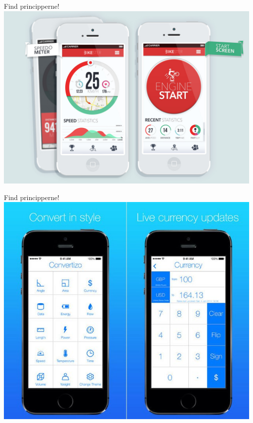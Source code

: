 \documentclass[10pt]{beamer}
\begin{document}
\begin{frame}{Find principperne!}
	\centering
	\includegraphics[width=\linewidth]{img/bikester.jpg}
\end{frame}

\begin{frame}{Find principperne!}
	\centering
	\includegraphics[width=\linewidth]{img/currencyconvert.jpg}
\end{frame}
\end{document}
